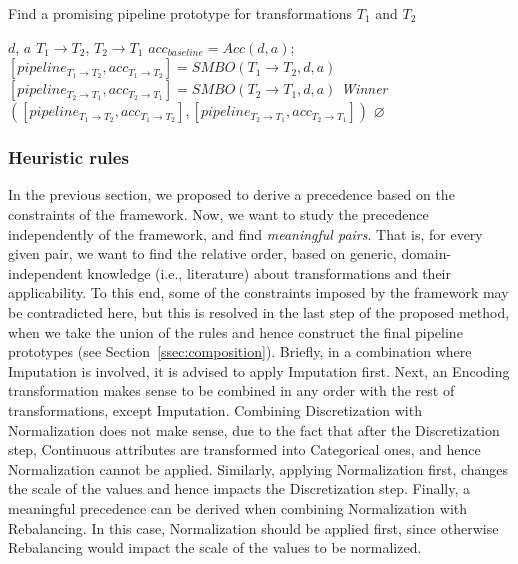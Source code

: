 \begin{algorithm*}[!h]
	\caption{Find a promising pipeline prototype for transformations $T_1$ and $T_2$}
	\label{alg:learned-rules}
	\begin{algorithmic}[1]
		\Require $d$, $a$ 
		\Require \indent$T_1\rightarrow T_2$, $T_2 \rightarrow T_1$ 
		\State $acc_{baseline} = Acc(d,a)$; 
		\State $[pipeline_{T_1\rightarrow T_2},acc_{T_1\rightarrow T_2}] = SMBO(T_1\rightarrow T_2,d, a)$
		\State $[pipeline_{T_2\rightarrow T_1},acc_{T_2\rightarrow T_1}] = SMBO(T_2\rightarrow T_1,d, a)$
        \State \Return \textit{Winner}$([pipeline_{T_1\rightarrow T_2},acc_{T_1\rightarrow T_2}],[pipeline_{T_2\rightarrow T_1},acc_{T_2\rightarrow T_1}])$ 
		\Else
		\State \Return $\varnothing$
		\EndIf
	\end{algorithmic}
\end{algorithm*}

\subsubsection{Heuristic rules}
\label{ssec:rules-heuristics}
In the previous section, we proposed to derive a precedence based on the constraints of the framework. Now, we want to study the precedence independently of the framework, and find \textit{meaningful pairs}. That is, for every given pair, we want to find the relative order, based on generic, domain-independent knowledge (i.e., literature) about transformations and their applicability. To this end, some of the constraints imposed by the framework may be contradicted here, but this is resolved in the last step of the proposed method, when we take the union of the rules and hence construct the final pipeline prototypes (see Section~\ref{ssec:composition}). Briefly, in a combination where Imputation is involved, it is advised to apply Imputation first. Next, an Encoding transformation makes sense to be combined in any order with the rest of transformations, except Imputation. 
Combining Discretization with Normalization does not make sense, due to the fact that after the Discretization step, Continuous attributes are transformed into Categorical ones, and hence Normalization cannot be applied. Similarly, applying Normalization first, changes the scale of the values and hence impacts the Discretization step. Finally, a meaningful precedence can be derived when combining Normalization with Rebalancing. In this case, Normalization should be applied first, since otherwise Rebalancing would impact the scale of the values to be normalized.

